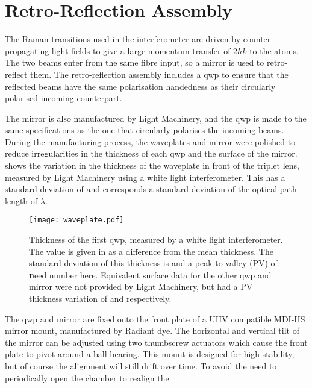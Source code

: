 \section{Retro-Reflection Assembly}\label{subsec:setup_ramanmirror} The
		Raman transitions used in the interferometer are driven by
		counter-propagating light fields to give a large momentum transfer of \(2
		\hbar k\) to the atoms. The two beams enter from the same fibre input, so a
		mirror is used to retro-reflect them. The retro-reflection assembly includes
		a \ac{qwp} to ensure that the reflected beams have the same polarisation
		handedness as their circularly polarised incoming counterpart. \par\noindent
		The mirror is also manufactured by Light Machinery, and the \ac{qwp} is made
		to the same specifications as the one that circularly polarises the incoming
		beams.  During the manufacturing process, the waveplates and mirror were
		polished to reduce irregularities in the thickness of each \ac{qwp} and the
		surface of the mirror.  shows the variation in
		the thickness of the waveplate in front of the triplet lens, measured by
		Light Machinery using a white light interferometer. This has a standard
		deviation of  and corresponds a standard
		deviation of the optical path length of \(\lambda\).
\begin{figure}[!htbp] 
  \centering
  \texttt{[image: waveplate.pdf]}
  \caption[Quarter-wave plate thickness variation.]{Thickness of the first \ac{qwp}, measured by a white light
		interferometer. The value is given in \sivalue{}{\nano\metre} as a
		difference from the mean thickness. The standard deviation of this thickness
		is  and a peak-to-valley (PV) of {\textbf need
		number here}. Equivalent surface data for the other \ac{qwp} and mirror were
		not provided by Light Machinery, but had a PV thickness variation of
		 and
		 respectively.} \label{fig:waveplate_map}
\end{figure} 
The \ac{qwp} and mirror are fixed onto the front
plate of a UHV compatible MDI-HS mirror mount, manufactured by Radiant dye. The
horizontal and vertical tilt of the mirror can be adjusted using two thumbscrew
actuators which cause the front plate to pivot around a ball bearing. This mount
is designed for high stability, but of course the alignment will still drift
over time. To avoid the need to periodically open the chamber to realign the
